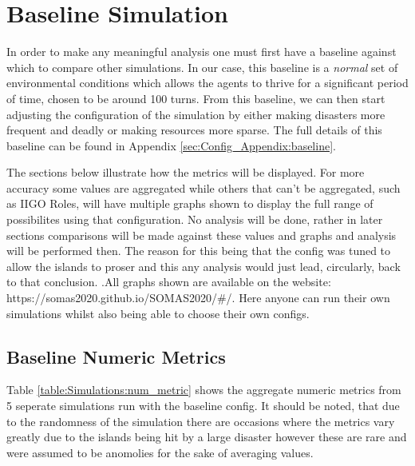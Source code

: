 \section{Baseline Simulation}
\label{sec:Simulations:baseline}

In order to make any meaningful analysis one must first have a baseline against which to compare other simulations. In our case, this baseline is a \emph{normal} set of environmental conditions which allows the agents to thrive for a significant period of time, chosen to be around 100 turns. From this baseline, we can then start adjusting the configuration of the simulation by either making disasters more frequent and deadly or making resources more sparse. The full details of this baseline can be found in Appendix \ref{sec:Config_Appendix:baseline}. 

The sections below illustrate how the metrics will be displayed. For more accuracy some values are aggregated while others that can't be aggregated, such as IIGO Roles, will have multiple graphs shown to display the full range of possibilites using that configuration. No analysis will be done, rather in later sections comparisons will be made against these values and graphs and analysis will be performed then. The reason for this being that the config was tuned to allow the islands to proser and this any analysis would just lead, circularly, back to that conclusion. .All graphs shown are available on the website: https://somas2020.github.io/SOMAS2020/\#/. Here anyone can run their own simulations whilst also being able to choose their own configs.

\subsection{Baseline Numeric Metrics}
\label{subsec:Simulations:baseline:num_metrics}

Table \ref{table:Simulations:num_metric} shows the aggregate numeric metrics from 5 seperate simulations run with the baseline config. It should be noted, that due to the randomness of the simulation there are occasions where the metrics vary greatly due to the islands being hit by a large disaster however these are rare and were assumed to be anomolies for the sake of averaging values.

